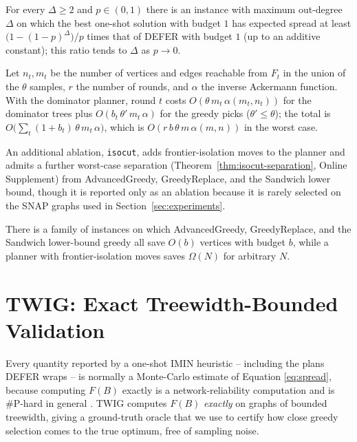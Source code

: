 \documentclass[ijoc,sglanonrev]{informs4}
\newcommand{\FF}{F}
\begin{document}
\begin{theorem}\label{thm:adaptivity-gap}
For every $\Delta\ge 2$ and $p\in(0,1)$ there is an instance with maximum
out-degree $\Delta$ on which the best one-shot solution with budget $1$ has
expected spread at least $\bigl(1-(1-p)^{\Delta}\bigr)/p$ times that of DEFER
with budget $1$ (up to an additive constant); this ratio tends to $\Delta$ as
$p\to 0$.
\end{theorem}

\begin{theorem}\label{thm:defer-complexity}
Let $n_t,m_t$ be the number of vertices and edges reachable from $F_t$ in
the union of the $\theta$ samples, $r$ the number of rounds, and $\alpha$
the inverse Ackermann function. With the dominator planner, round $t$ costs
$O(\theta\,m_t\,\alpha(m_t,n_t))$ for the dominator trees plus
$O(b_t\,\theta'\,m_t\,\alpha)$ for the greedy picks ($\theta'\le\theta$);
the total is $O\bigl(\sum_t(1+b_t)\,\theta\,m_t\,\alpha\bigr)$, which is
$O(r\,b\,\theta\,m\,\alpha(m,n))$ in the worst case.
\end{theorem}

An additional ablation, \texttt{isocut}, adds frontier-isolation moves to
the planner and admits a further worst-case separation
(Theorem~\ref{thm:isocut-separation}, Online Supplement) from
AdvancedGreedy, GreedyReplace, and the Sandwich lower bound, though it is
reported only as an ablation because it is rarely selected on the SNAP
graphs used in Section~\ref{sec:experiments}.

\begin{theorem}\label{thm:isocut-separation}
There is a family of instances on which AdvancedGreedy, GreedyReplace, and
the Sandwich lower-bound greedy all save $O(b)$ vertices with budget $b$,
while a planner with frontier-isolation moves saves $\Omega(N)$ for
arbitrary $N$.
\end{theorem}

\section{TWIG: Exact Treewidth-Bounded Validation}\label{sec:twig}

Every quantity reported by a one-shot IMIN heuristic -- including the plans
DEFER wraps -- is normally a Monte-Carlo estimate of Equation
\eqref{eq:spread}, because computing $\FF(B)$ exactly is a network-reliability
computation and is \#P-hard in general \citep{valiant1979,provan1983}. TWIG
computes $\FF(B)$ \emph{exactly} on graphs of bounded treewidth, giving a
ground-truth oracle that we use to certify how close greedy selection comes
to the true optimum, free of sampling noise.
\end{document}
